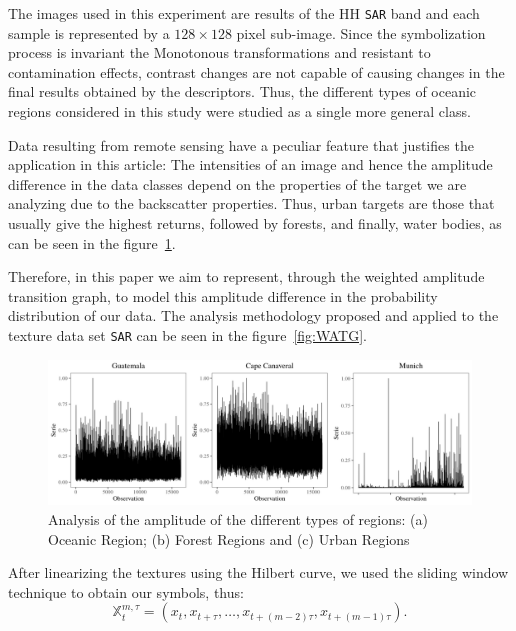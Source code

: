 \documentclass{isprs}
\begin{document}
	The images used in this experiment are results of the HH \texttt{SAR} band and each sample is represented by a $128 \times 128$ pixel sub-image.
	Since the symbolization process is invariant the Monotonous transformations and resistant to contamination effects, contrast changes are not capable of causing changes in the final results obtained by the descriptors.
	Thus, the different types of oceanic regions considered in this study were studied as a single more general class.
	
	Data resulting from remote sensing have a peculiar feature that justifies the application in this article:
	The intensities of an image and hence the amplitude difference in the data classes depend on the properties of the target we are analyzing due to the backscatter properties.
	Thus, urban targets are those that usually give the highest returns, followed by forests, and finally, water bodies, as can be seen in the figure~\ref{fig:AmplitudeSAR}.
	
	Therefore, in this paper we aim to represent, through the weighted amplitude transition graph, to model this amplitude difference in the probability distribution of our data.
	The analysis methodology proposed and applied to the texture data set \texttt{SAR} can be seen in the figure~\ref{fig:WATG}.
	
	\begin{figure}[hbt]
		\includegraphics[scale = 0.28]{Figures/SAR_signal.pdf}
		\caption{Analysis of the amplitude of the different types of regions: (a) Oceanic Region; (b) Forest Regions and (c) Urban Regions}
		\label{fig:AmplitudeSAR}
	\end{figure}
	
	After linearizing the textures using the Hilbert curve, we used the sliding window technique to obtain our symbols, thus:
	\begin{equation}
	\mathbb{X}_t^{m,\tau} = (x_{t}, x_{t+\tau},\ldots, x_{t+(m-2)\tau} ,x_{t+(m-1)\tau}).
	\end{equation}
	
\end{document}
